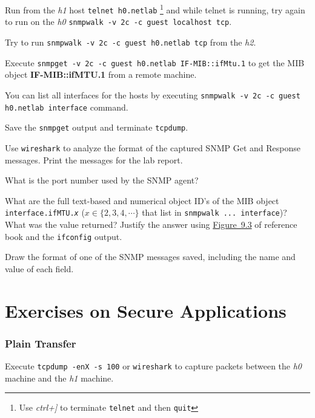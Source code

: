 \documentclass{../UTNetLab}
\begin{document}
    Run from the \textit{h1} host \lstinline[emph={h0,netlab}]{telnet h0.netlab} \footnote{Use \textit{ctrl+]} to terminate \lstinline{telnet} and then \lstinline{quit}} and while telnet is running, try again to run on the \textit{h0}  \lstinline[breaklines=true,escapechar={\ }]{snmpwalk -v 2c -c guest localhost tcp}.

    Try to run \lstinline[emph={h0,netlab,guest},morekeywords={[2]tcp}]{snmpwalk -v 2c -c guest h0.netlab tcp} from the \textit{h2}.

    Execute \lstinline[emph={your-host, h0,netlab,guest},morekeywords={[2]IF-MIB,ifMtu}]{snmpget -v 2c -c guest h0.netlab IF-MIB::ifMtu.1} to get the MIB object \textbf{IF-MIB::ifMTU.1} from a remote machine.
    
    You can list all interfaces for the hosts by executing \lstinline[emph={guest,h0,netlab}]{snmpwalk -v 2c -c guest h0.netlab interface} command.

    Save the \lstinline{snmpget} output and terminate \lstinline{tcpdump}.

    Use \lstinline{wireshark} to analyze the format of the captured SNMP Get and Response messages.
    Print the messages for the lab report.
    
    \begin{report}
        \item What is the port number used by the SNMP agent?
        
        \item What are the full text-based and numerical object ID’s of the MIB object \texttt{interface.ifMTU.\textit{x}} ($x \in \{2,3,4,\cdots\}$ that list in \lstinline{snmpwalk ... interface})? What was the value returned? Justify the answer using \hyperref[fig:9.3]{Figure~9.3} of reference book and the \lstinline{ifconfig} output.
        
        \item Draw the format of one of the SNMP messages saved, including the name and value of each field.
    \end{report}

\part{Exercises on Secure Applications}
    
\section{Plain Transfer}
    Execute \lstinline{tcpdump -enX -s 100} or \lstinline{wireshark} to capture packets between the \textit{h0} machine and the \textit{h1} machine.
\end{document}
